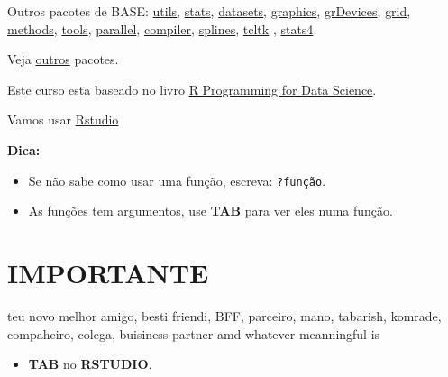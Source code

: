 \documentclass[]{book}
\providecommand{\tightlist}{%
  \setlength{\itemsep}{0pt}\setlength{\parskip}{0pt}}
\begin{document}
Outros pacotes de BASE:
\href{http://stat.ethz.ch/R-manual/R-devel/library/utils/html/00Index.html}{utils},
\href{http://stat.ethz.ch/R-manual/R-devel/library/stats/html/00Index.html}{stats},
\href{http://stat.ethz.ch/R-manual/R-devel/library/datasets/html/00Index.html}{datasets},
\href{http://stat.ethz.ch/R-manual/R-devel/library/graphics/html/00Index.html}{graphics},
\href{https://stat.ethz.ch/R-manual/R-devel/library/grDevices/html/00Index.html}{grDevices},
\href{https://stat.ethz.ch/R-manual/R-devel/library/grid/html/00Index.html}{grid},
\href{https://stat.ethz.ch/R-manual/R-devel/library/methods/html/00Index.html}{methods},
\href{https://stat.ethz.ch/R-manual/R-devel/library/tools/html/00Index.html}{tools},
\href{https://stat.ethz.ch/R-manual/R-devel/library/parallel/html/00Index.html}{parallel},
\href{https://stat.ethz.ch/R-manual/R-devel/library/compiler/html/00Index.html}{compiler},
\href{https://stat.ethz.ch/R-manual/R-devel/library/splines/html/00Index.html}{splines},
\href{https://stat.ethz.ch/R-manual/R-devel/library/tcltk/html/00Index.html}{tcltk}
,
\href{https://stat.ethz.ch/R-manual/R-devel/library/stats4/html/00Index.html}{stats4}.

Veja
\href{https://cran.r-project.org/web/packages/available_packages_by_name.html}{outros}
pacotes.

Este curso esta baseado no livro
\href{https://leanpub.com/rprogramming}{R Programming for Data Science}.

Vamos usar \href{https://www.rstudio.com/}{Rstudio}

\textbf{Dica:}

\begin{itemize}
\tightlist
\item
  Se não sabe como usar uma função, escreva: \texttt{?função}.
\item
  As funções tem argumentos, use \textbf{TAB} para ver eles numa função.
\end{itemize}

\section{IMPORTANTE}\label{importante}

teu novo melhor amigo, besti friendi, BFF, parceiro, mano, tabarish,
komrade, compaheiro, colega, buisiness partner amd whatever meanningful
is

\begin{itemize}
\tightlist
\item
  \textbf{TAB} no \textbf{RSTUDIO}.
\end{itemize}
\end{document}
